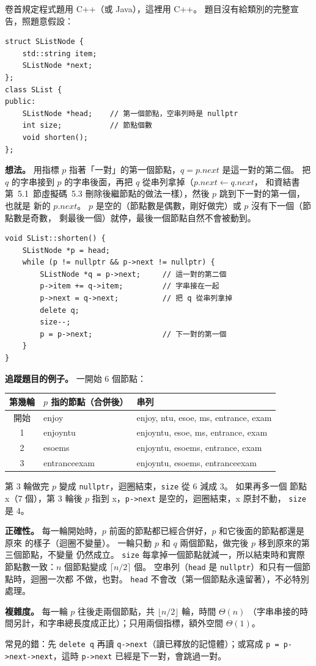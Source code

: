 \begin{pastsoln}
卷首規定程式題用 C++（或 Java），這裡用 C++。 題目沒有給類別的完整宣告，照題意假設：
\begin{verbatim}
struct SListNode {
    std::string item;
    SListNode *next;
};
class SList {
public:
    SListNode *head;    // 第一個節點，空串列時是 nullptr
    int size;           // 節點個數
    void shorten();
};
\end{verbatim}

\textbf{想法。} 用指標 $p$ 指著「一對」的第一個節點，$q = p.\mathit{next}$ 是這一對的第二個。
把 $q$ 的字串接到 $p$ 的字串後面，再把 $q$ 從串列拿掉（$p.\mathit{next} \gets q.\mathit{next}$，
和資結書第~5.1~節虛擬碼~5.3 刪除後繼節點的做法一樣），然後 $p$ 跳到下一對的第一個，也就是
新的 $p.\mathit{next}$。 $p$ 是空的（節點數是偶數，剛好做完）或 $p$ 沒有下一個（節點數是奇數，
剩最後一個）就停，最後一個節點自然不會被動到。
\begin{verbatim}
void SList::shorten() {
    SListNode *p = head;
    while (p != nullptr && p->next != nullptr) {
        SListNode *q = p->next;     // 這一對的第二個
        p->item += q->item;         // 字串接在一起
        p->next = q->next;          // 把 q 從串列拿掉
        delete q;
        size--;
        p = p->next;                // 下一對的第一個
    }
}
\end{verbatim}

\textbf{追蹤題目的例子。} 一開始 $6$ 個節點：
\begin{center}
\small
\begin{tabular}{cll}
\toprule
第幾輪 & $p$ 指的節點（合併後） & 串列 \\
\midrule
開始 & enjoy & enjoy, ntu, esoe, ms, entrance, exam \\
1 & enjoyntu & enjoyntu, esoe, ms, entrance, exam \\
2 & esoems & enjoyntu, esoems, entrance, exam \\
3 & entranceexam & enjoyntu, esoems, entranceexam \\
\bottomrule
\end{tabular}
\end{center}
第 3 輪做完 $p$ 變成 \texttt{nullptr}，迴圈結束，\texttt{size} 從 $6$ 減成 $3$。 如果再多一個
節點 x（$7$ 個），第 3 輪後 $p$ 指到 x，\texttt{p->next} 是空的，迴圈結束，x 原封不動，
\texttt{size} 是 $4$。

\textbf{正確性。} 每一輪開始時，$p$ 前面的節點都已經合併好，$p$ 和它後面的節點都還是原來
的樣子（迴圈不變量）。 一輪只動 $p$ 和 $q$ 兩個節點，做完後 $p$ 移到原來的第三個節點，不變量
仍然成立。 \texttt{size} 每拿掉一個節點就減一，所以結束時和實際節點數一致：$n$ 個節點變成
$\lceil n/2 \rceil$ 個。 空串列（\texttt{head} 是 \texttt{nullptr}）和只有一個節點時，迴圈一次都
不做，也對。 \texttt{head} 不會改（第一個節點永遠留著），不必特別處理。

\textbf{複雜度。} 每一輪 $p$ 往後走兩個節點，共 $\lfloor n/2 \rfloor$ 輪，時間 $\Theta(n)$
（字串串接的時間另計，和字串總長度成正比）；只用兩個指標，額外空間 $\Theta(1)$。

常見的錯：先 \texttt{delete q} 再讀 \texttt{q->next}（讀已釋放的記憶體）；或寫成
\texttt{p = p->next->next}，這時 \texttt{p->next} 已經是下一對，會跳過一對。
\end{pastsoln}
